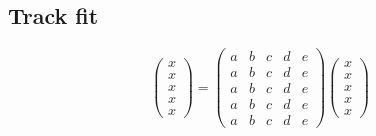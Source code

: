 \subsection{Track fit}

\begin{equation}
 \left( 
   \begin{array}{c}
   x \\ x \\ x \\ x \\ x
   \end{array}
 \right)
 =
 \left( \begin{array}{ccccc}
         a & b & c & d & e \\
         a & b & c & d & e \\
         a & b & c & d & e \\
         a & b & c & d & e \\
         a & b & c & d & e
        \end{array}
 \right)
 \left( 
   \begin{array}{c}
   x \\ x \\ x \\ x \\ x
   \end{array}
 \right)
\end{equation}
